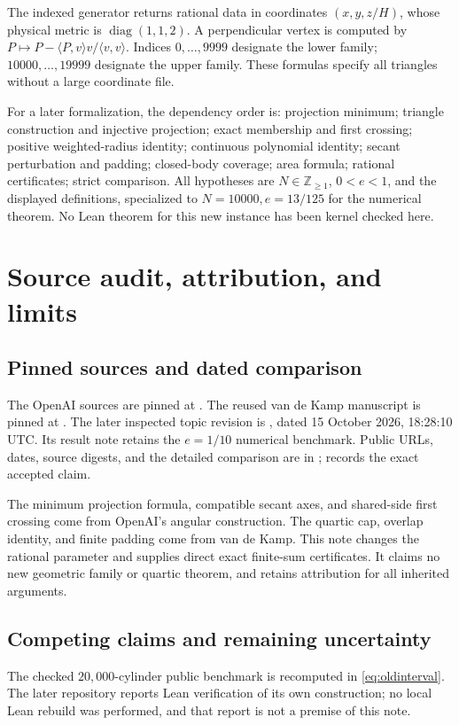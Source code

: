 \documentclass[11pt]{article}
\begin{document}
The indexed generator returns rational data in coordinates \((x,y,z/H)\),
whose physical metric is \(\operatorname{diag}(1,1,2)\).
A perpendicular vertex is computed by
\(P\mapsto P-\langle P,v\rangle v/\langle v,v\rangle\).
Indices \(0,\ldots,9999\) designate the lower family;
\(10000,\ldots,19999\) designate the upper family.
These formulas specify all triangles without a large coordinate file.

For a later formalization, the dependency order is:
projection minimum; triangle construction and injective projection;
exact membership and first crossing; positive weighted-radius identity;
continuous polynomial identity; secant perturbation and padding;
closed-body coverage; area formula; rational certificates; strict comparison.
All hypotheses are \(N\in\mathbb Z_{\ge1}\), \(0<e<1\), and the displayed
definitions, specialized to \(N=10000,e=13/125\) for the numerical theorem.
No Lean theorem for this new instance has been kernel checked here.

\section{Source audit, attribution, and limits}\label{sec:limits}
\subsection{Pinned sources and dated comparison}\label{sec:sources}
The OpenAI sources are pinned at
.
The reused van de Kamp manuscript \cite{vdk-secant} is pinned at
.
The later inspected topic revision is
,
dated 15 October 2026, 18:28:10 UTC. Its result note
\cite{vdk-result} retains the \(e=1/10\) numerical benchmark.
Public URLs, dates, source digests, and the detailed comparison are in
;  records the exact accepted claim.

The minimum projection formula, compatible secant axes, and shared-side
first crossing come from OpenAI's angular construction.
The quartic cap, overlap identity, and finite padding come from van de Kamp.
This note changes the rational parameter and supplies direct exact
finite-sum certificates. It claims no new geometric family or quartic
theorem, and retains attribution for all inherited arguments.

\subsection{Competing claims and remaining uncertainty}
The checked \(20{,}000\)-cylinder public benchmark is recomputed in
\eqref{eq:oldinterval}. The later repository reports Lean verification
of its own construction; no local Lean rebuild was performed, and
that report is not a premise of this note.
\end{document}
